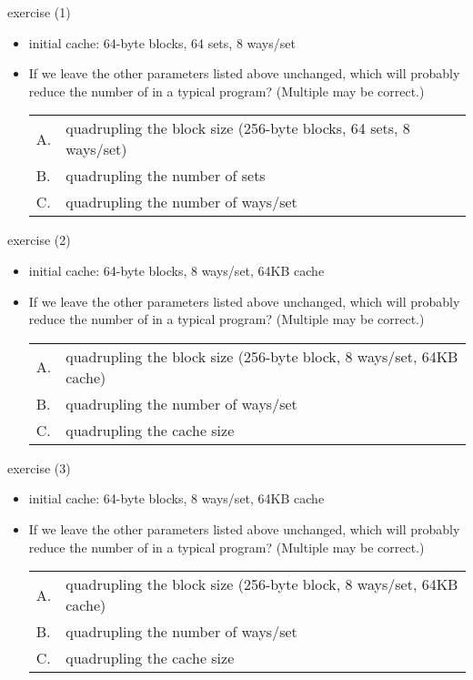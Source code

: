 \begin{frame}{exercise (1)}
    \begin{itemize}
    \item initial cache: 64-byte blocks, 64 sets, 8 ways/set
    \vspace{.5cm}
\item If we leave the other parameters listed above unchanged, which will probably reduce
    the number of  in a typical program? 
    (Multiple may be correct.) \\
    \begin{tabular}{ll}
        A. & quadrupling  the block size {\small (256-byte blocks, 64 sets, 8 ways/set)}\\
        B. & quadrupling the number of sets \\
        C. & quadrupling the number of ways/set\\
    \end{tabular}
    \end{itemize}
\end{frame}

\begin{frame}{exercise (2)}
    \begin{itemize}
    \item initial cache: 64-byte blocks, 8 ways/set, 64KB cache
    \vspace{.5cm}
\item If we leave the other parameters listed above unchanged, which will probably reduce
    the number of  in a typical program? (Multiple may be correct.) \\
    \begin{tabular}{ll}
        A. & quadrupling the block size {\small (256-byte block, 8 ways/set, 64KB cache)}\\
    B. & quadrupling the number of ways/set \\
    C. & quadrupling the cache size \\
    \end{tabular}
    \end{itemize}
\end{frame}

\begin{frame}{exercise (3)}
    \begin{itemize}
    \item initial cache: 64-byte blocks, 8 ways/set, 64KB cache
    \vspace{.5cm}
\item If we leave the other parameters listed above unchanged, which will probably reduce
    the number of  in a typical program? (Multiple may be correct.) \\
    \begin{tabular}{ll}
        A. & quadrupling the block size {\small (256-byte block, 8 ways/set, 64KB cache)}\\
    B. & quadrupling the number of ways/set \\
    C. & quadrupling the cache size \\
    \end{tabular}
    \end{itemize}
\end{frame}
